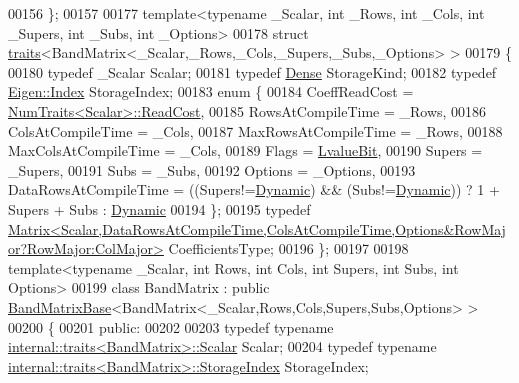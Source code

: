 \begin{DoxyCode}
00156 \};
00157 
00177 \textcolor{keyword}{template}<\textcolor{keyword}{typename} \_Scalar, \textcolor{keywordtype}{int} \_Rows, \textcolor{keywordtype}{int} \_Cols, \textcolor{keywordtype}{int} \_Supers, \textcolor{keywordtype}{int} \_Subs, \textcolor{keywordtype}{int} \_Options>
00178 \textcolor{keyword}{struct }\hyperlink{struct_eigen_1_1internal_1_1traits}{traits}<BandMatrix<\_Scalar,\_Rows,\_Cols,\_Supers,\_Subs,\_Options> >
00179 \{
00180   \textcolor{keyword}{typedef} \_Scalar Scalar;
00181   \textcolor{keyword}{typedef} \hyperlink{struct_eigen_1_1_dense}{Dense} StorageKind;
00182   \textcolor{keyword}{typedef} \hyperlink{namespace_eigen_a62e77e0933482dafde8fe197d9a2cfde}{Eigen::Index} StorageIndex;
00183   \textcolor{keyword}{enum} \{
00184     CoeffReadCost = \hyperlink{group___core___module_struct_eigen_1_1_num_traits}{NumTraits<Scalar>::ReadCost},
00185     RowsAtCompileTime = \_Rows,
00186     ColsAtCompileTime = \_Cols,
00187     MaxRowsAtCompileTime = \_Rows,
00188     MaxColsAtCompileTime = \_Cols,
00189     Flags = \hyperlink{group__flags_gae2c323957f20dfdc6cb8f44428eaec1a}{LvalueBit},
00190     Supers = \_Supers,
00191     Subs = \_Subs,
00192     Options = \_Options,
00193     DataRowsAtCompileTime = ((Supers!=\hyperlink{namespace_eigen_ad81fa7195215a0ce30017dfac309f0b2}{Dynamic}) && (Subs!=\hyperlink{namespace_eigen_ad81fa7195215a0ce30017dfac309f0b2}{Dynamic})) ? 1 + Supers + Subs : 
      \hyperlink{namespace_eigen_ad81fa7195215a0ce30017dfac309f0b2}{Dynamic}
00194   \};
00195   \textcolor{keyword}{typedef} 
      \hyperlink{group___core___module_class_eigen_1_1_matrix}{Matrix<Scalar,DataRowsAtCompileTime,ColsAtCompileTime,Options&RowMajor?RowMajor:ColMajor>}
       CoefficientsType;
00196 \};
00197 
00198 \textcolor{keyword}{template}<\textcolor{keyword}{typename} \_Scalar, \textcolor{keywordtype}{int} Rows, \textcolor{keywordtype}{int} Cols, \textcolor{keywordtype}{int} Supers, \textcolor{keywordtype}{int} Subs, \textcolor{keywordtype}{int} Options>
00199 \textcolor{keyword}{class }BandMatrix : \textcolor{keyword}{public} \hyperlink{class_eigen_1_1internal_1_1_band_matrix_base}{BandMatrixBase}<BandMatrix<\_Scalar,Rows,Cols,Supers,Subs,Options> >
00200 \{
00201   \textcolor{keyword}{public}:
00202 
00203     \textcolor{keyword}{typedef} \textcolor{keyword}{typename} \hyperlink{struct_eigen_1_1internal_1_1traits}{internal::traits<BandMatrix>::Scalar} Scalar;
00204     \textcolor{keyword}{typedef} \textcolor{keyword}{typename} \hyperlink{struct_eigen_1_1internal_1_1traits}{internal::traits<BandMatrix>::StorageIndex} 
      StorageIndex;

\end{DoxyCode}

